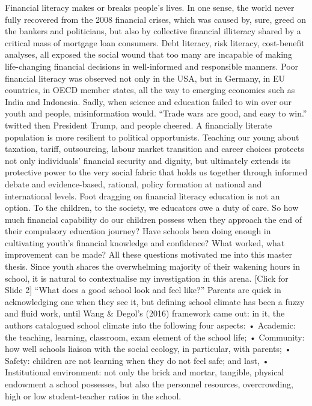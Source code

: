 Financial literacy makes or breaks people’s lives.
In one sense, the world never fully recovered from the 2008 financial crises, which was caused by, sure, greed on the bankers and politicians, but also by collective financial illiteracy shared by a critical mass of mortgage loan consumers. Debt literacy, risk literacy, cost-benefit analyses, all exposed the social wound that too many are incapable of making life-changing financial decisions in well-informed and responsible manners.
Poor financial literacy was observed not only in the USA, but in Germany, in EU countries, in OECD member states, all the way to emerging economies such as India and Indonesia.
Sadly, when science and education failed to win over our youth and people, misinformation would. “Trade wars are good, and easy to win.” twitted then President Trump, and people cheered.
A financially literate population is more resilient to political opportunists. Teaching our young about taxation, tariff, outsourcing, labour market transition and career choices protects not only individuals’ financial security and dignity, but ultimately extends its protective power to the very social fabric that holds us together through informed debate and evidence-based, rational, policy formation at national and international levels.
Foot dragging on financial literacy education is not an option. To the children, to the society, we educators owe a duty of care.
So how much financial capability do our children possess when they approach the end of their compulsory education journey? Have schools been doing enough in cultivating youth’s financial knowledge and confidence? What worked, what improvement can be made? All these questions motivated me into this master thesis.
Since youth shares the overwhelming majority of their wakening hours in school, it is natural to contextualise my investigation in this arena.
[Click for Slide 2]
“What does a good school look and feel like?” Parents are quick in acknowledging one when they see it, but defining school climate has been a fuzzy and fluid work, until Wang & Degol’s (2016) framework came out: in it, the authors catalogued school climate into the following four aspects:
•	Academic: the teaching, learning, classroom, exam element of the school life;
•	Community: how well schools liaison with the social ecology, in particular, with parents;
•	Safety: children are not learning when they do not feel safe; and last,
•	Institutional environment: not only the brick and mortar, tangible, physical endowment a school possesses, but also the personnel resources, overcrowding, high or low student-teacher ratios in the school.
